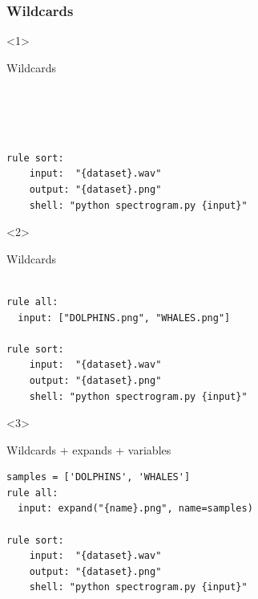 \documentclass{beamer}
\begin{document}
\begin{frame}[fragile]
\frametitle{Wildcards}
\small
{}
\begin{center}
    \begin{minipage}{11cm}
        \begin{onlyenv}<1>            
            \begin{block}{Wildcards}
                \begin{lstlisting}[basicstyle=\large]
            
            
       
  
rule sort:
    input:  "{dataset}.wav"
    output: "{dataset}.png"
    shell: "python spectrogram.py {input}"  
                  \end{lstlisting}    
               \end{block}

            \end{onlyenv}        
    
    \begin{onlyenv}<2>   
        \begin{block}{Wildcards}
            \begin{lstlisting}[basicstyle=\large]            
            
rule all:
  input: ["DOLPHINS.png", "WHALES.png"]
  
rule sort:
    input:  "{dataset}.wav"
    output: "{dataset}.png"
    shell: "python spectrogram.py {input}"  

    \end{lstlisting}    
        \end{block}
             \end{onlyenv}

         
    \begin{onlyenv}<3>  
        \begin{block}{Wildcards + expands + variables}
            \begin{lstlisting}[basicstyle=\large] 
samples = ['DOLPHINS', 'WHALES']            
rule all:
  input: expand("{name}.png", name=samples)

rule sort:
    input:  "{dataset}.wav"
    output: "{dataset}.png"
    shell: "python spectrogram.py {input}"
           \end{lstlisting}     
  \end{block}
     \end{onlyenv}        
    \end{minipage}
 \end{center}
 
\end{frame}
        
\end{document}
